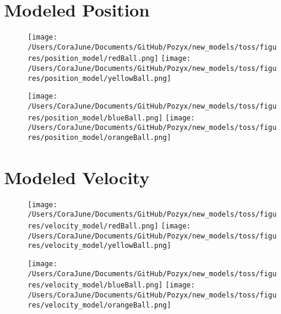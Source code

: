 \documentclass{article}
\begin{document}
\section{Modeled Position}
\begin{figure}[h!]
\begin{multicols}{2}
    \texttt{[image: /Users/CoraJune/Documents/GitHub/Pozyx/new\_models/toss/figures/position\_model/redBall.png]}
    \texttt{[image: /Users/CoraJune/Documents/GitHub/Pozyx/new\_models/toss/figures/position\_model/yellowBall.png]}
\end{multicols}

\begin{multicols}{2}
    \texttt{[image: /Users/CoraJune/Documents/GitHub/Pozyx/new\_models/toss/figures/position\_model/blueBall.png]}
    \texttt{[image: /Users/CoraJune/Documents/GitHub/Pozyx/new\_models/toss/figures/position\_model/orangeBall.png]}
\end{multicols}


\end{figure}
\newpage
\section{Modeled Velocity}
\begin{figure}[h!]
\begin{multicols}{2}
    \texttt{[image: /Users/CoraJune/Documents/GitHub/Pozyx/new\_models/toss/figures/velocity\_model/redBall.png]}
    \texttt{[image: /Users/CoraJune/Documents/GitHub/Pozyx/new\_models/toss/figures/velocity\_model/yellowBall.png]}
\end{multicols}

\begin{multicols}{2}
    \texttt{[image: /Users/CoraJune/Documents/GitHub/Pozyx/new\_models/toss/figures/velocity\_model/blueBall.png]}
    \texttt{[image: /Users/CoraJune/Documents/GitHub/Pozyx/new\_models/toss/figures/velocity\_model/orangeBall.png]}
\end{multicols}

\end{figure}
\newpage
\end{document}

